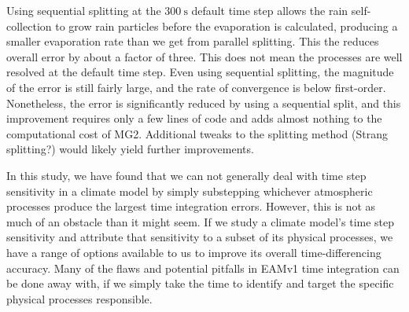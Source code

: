 \documentclass [11pt, proquest] {uwthesis}[2020/02/24]
\begin{document}
Using sequential splitting at the $\SI{300}{\second}$ default time step allows the rain self-collection to grow rain particles before the evaporation is calculated, producing a smaller evaporation rate than we get from parallel splitting. This the reduces overall error by about a factor of three. This does not mean the processes are well resolved at the default time step. Even using sequential splitting, the magnitude of the error is still fairly large, and the rate of convergence is below first-order. Nonetheless, the error is significantly reduced by using a sequential split, and this improvement requires only a few lines of code and adds almost nothing to the computational cost of MG2. Additional tweaks to the splitting method (Strang splitting?) would likely yield further improvements.

In this study, we have found that we can not generally deal with time step sensitivity in a climate model by simply substepping whichever atmospheric processes produce the largest time integration errors. However, this is not as much of an obstacle than it might seem. If we study a climate model's time step sensitivity and attribute that sensitivity to a subset of its physical processes, we have a range of options available to us to improve its overall time-differencing accuracy. Many of the flaws and potential pitfalls in EAMv1 time integration can be done away with, if we simply take the time to identify and target the specific physical processes responsible.

\printendnotes

%
%
%
\printbibliography[heading=bibintoc]
%
%
\appendix
\raggedbottom\sloppy
 
 
\end{document}

